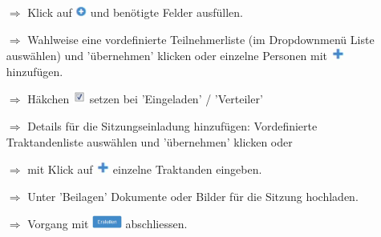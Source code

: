 \documentclass{article}
\begin{document}
\begin{multicols}{2}

\begin{tcolorbox}[colback=blue!5,colframe=blue!40!black,title=Zu einer neuen Sitzung einladen]
\begin{itemize}
  \item[$\Longrightarrow$] Klick auf \includegraphics[height=10pt]{Icons/Plussymbol.jpg} und benötigte Felder ausfüllen.
  \item[$\Longrightarrow$] Wahlweise eine vordefinierte Teilnehmerliste (im Dropdownmenü Liste auswählen) und 'übernehmen' klicken oder einzelne Personen mit \includegraphics[height=12pt]{Icons/Pluszeichen.jpg} hinzufügen.
  \item[$\Longrightarrow$] Häkchen \includegraphics[height=12pt]{Icons/sbox_ok.jpg} setzen bei 'Eingeladen' / 'Verteiler'
	\item[$\Longrightarrow$] Details für die Sitzungseinladung hinzufügen: Vordefinierte Traktandenliste auswählen und 'übernehmen' klicken oder
  \item[$\Longrightarrow$] mit Klick auf \includegraphics[height=12pt]{Icons/Pluszeichen.jpg}  einzelne Traktanden eingeben.
  \item[$\Longrightarrow$] Unter 'Beilagen' Dokumente oder Bilder für die Sitzung hochladen.						
	\item[$\Longrightarrow$] Vorgang mit \includegraphics[height=12pt]{Icons/B_Erstellen.jpg} abschliessen.
\end{itemize}
\end{tcolorbox}





\end{multicols}
\end{document}
